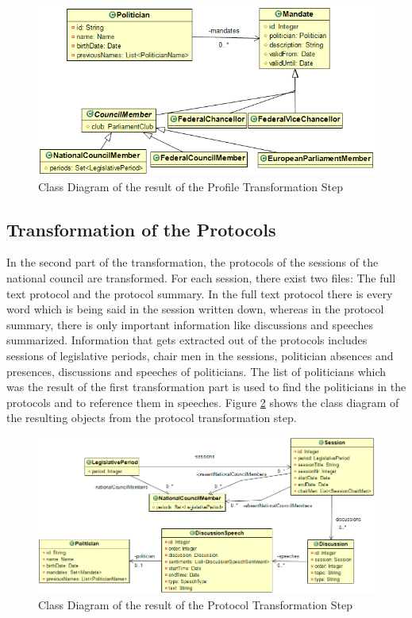 
\begin{figure}
	\centering
	\includegraphics[width=\textwidth]{imgs/politicians_mandates_class_diagram}
	\caption{Class Diagram of the result of the Profile Transformation Step}
	\label{fig:politicians_mandates_class_diagram}
\end{figure}

\subsection{Transformation of the Protocols}
In the second part of the transformation, the protocols of the sessions of the national council are transformed. For each session, there exist two files: The full text protocol and the protocol summary. In the full text protocol there is every word which is being said in the session written down, whereas in the protocol summary, there is only important information like discussions and speeches summarized. Information that gets extracted out of the protocols includes sessions of legislative periods, chair men in the sessions, politician absences and presences, discussions and speeches of politicians. The list of politicians which was the result of the first transformation part is used to find the politicians in the protocols and to reference them in speeches. Figure \ref{fig:session_class_diagram} shows the class diagram of the resulting objects from the protocol transformation step.

\begin{figure}
	\centering
	\includegraphics[width=\textwidth]{imgs/session_class_diagram}
	\caption{Class Diagram of the result of the Protocol Transformation Step}
	\label{fig:session_class_diagram}
\end{figure}


